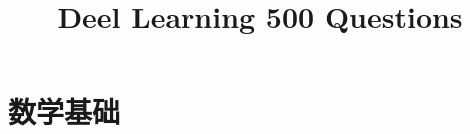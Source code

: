\documentclass{book}
\title{\hbf Deel Learning 500 Questions}
\begin{document}
\maketitle
\tableofcontents

\chapter{数学基础} %


\end{document}
